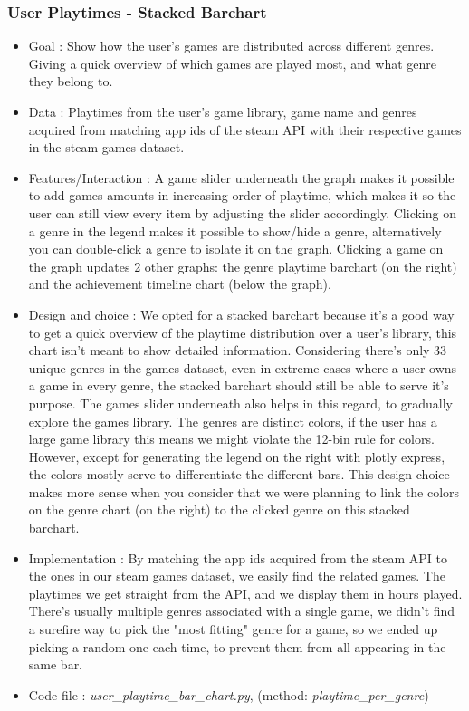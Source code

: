 \documentclass{article}
\begin{document}
   	\subsubsection{User Playtimes - Stacked Barchart}
       	\begin{itemize}
           \item Goal : Show how the user's games are distributed across different genres. Giving a quick overview of which games are played most, and what genre they belong to.
           \item Data : Playtimes from the user's game library, game name and genres acquired from matching app ids of the steam API with their respective games in the steam games dataset.
           \item Features/Interaction : A game slider underneath the graph makes it possible to add games amounts in increasing order of playtime, which makes it so the user can still view every item by adjusting the slider accordingly. Clicking on a genre in the legend makes it possible to show/hide a genre, alternatively you can double-click a genre to isolate it on the graph. Clicking a game on the graph updates 2 other graphs: the genre playtime barchart (on the right) and the achievement timeline chart (below the graph).
           \item Design and choice : We opted for a stacked barchart because it's a good way to get a quick overview of the playtime distribution over a user's library, this chart isn't meant to show detailed information. Considering there's only 33 unique genres in the games dataset, even in extreme cases where a user owns a game in every genre, the stacked barchart should still be able to serve it's purpose. The games slider underneath also helps in this regard, to gradually explore the games library. The genres are distinct colors, if the user has a large game library this means we might violate the 12-bin rule for colors. However, except for generating the legend on the right with plotly express, the colors mostly serve to differentiate the different bars. This design choice makes more sense when you consider that we were planning to link the colors on the genre chart (on the right) to the clicked genre on this stacked barchart. 
           \item Implementation : By matching the app ids acquired from the steam API to the ones in our steam games dataset, we easily find the related games. The playtimes we get straight from the API, and we display them in hours played. There's usually multiple genres associated with a single game, we didn't find a surefire way to pick the "most fitting" genre for a game, so we ended up picking a random one each time, to prevent them from all appearing in the same bar. 
           \item Code file : \textit{user\_playtime\_bar\_chart.py}, (method: \textit{playtime\_per\_genre})
        \end{itemize}
        
\end{document}
